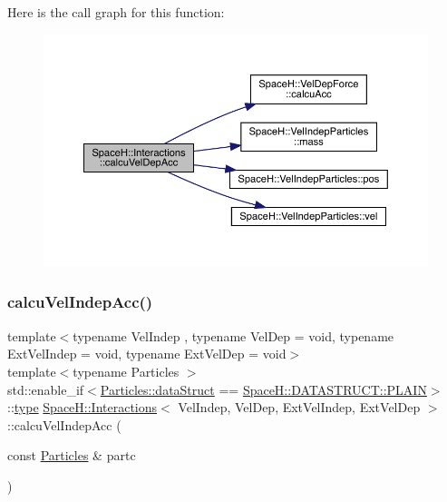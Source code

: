 Here is the call graph for this function\+:
\nopagebreak
\begin{figure}[H]
\begin{center}
\leavevmode
\includegraphics[width=350pt]{class_space_h_1_1_interactions_aedfdfea7ed97d4ee203b8779ae58b202_cgraph}
\end{center}
\end{figure}
\mbox{\label{class_space_h_1_1_interactions_a648a2de8140f2f29fc9599fe8aed3b60}} 
\subsubsection{\texorpdfstring{calcu\+Vel\+Indep\+Acc()}{calcuVelIndepAcc()}\hspace{0.1cm}{\footnotesize\ttfamily [1/2]}}
{\footnotesize\ttfamily template$<$typename Vel\+Indep , typename Vel\+Dep  = void, typename Ext\+Vel\+Indep  = void, typename Ext\+Vel\+Dep  = void$>$ \\
template$<$typename Particles $>$ \\
std\+::enable\+\_\+if$<$\mbox{\hyperlink{class_space_h_1_1_vel_indep_particles_a066cbb08e0d444c27e2f71c30092e13f}{Particles\+::data\+Struct}} == \mbox{\hyperlink{namespace_space_h_a4782f089179a3c269891f02482b072dfaf62eb0bf5e5c72e80983fbbac1cb70e5}{Space\+H\+::\+D\+A\+T\+A\+S\+T\+R\+U\+C\+T\+::\+P\+L\+A\+IN}}$>$\+::\mbox{\hyperlink{class_space_h_1_1_interactions_aa45fc9367bfa0b8693700525ffa2655f}{type}} \mbox{\hyperlink{class_space_h_1_1_interactions}{Space\+H\+::\+Interactions}}$<$ Vel\+Indep, Vel\+Dep, Ext\+Vel\+Indep, Ext\+Vel\+Dep $>$\+::calcu\+Vel\+Indep\+Acc (\begin{DoxyParamCaption}\item[{const \mbox{\hyperlink{struct_space_h_1_1_particles}{Particles}} \&}]{partc }\end{DoxyParamCaption})\hspace{0.3cm}{\ttfamily [inline]}}

